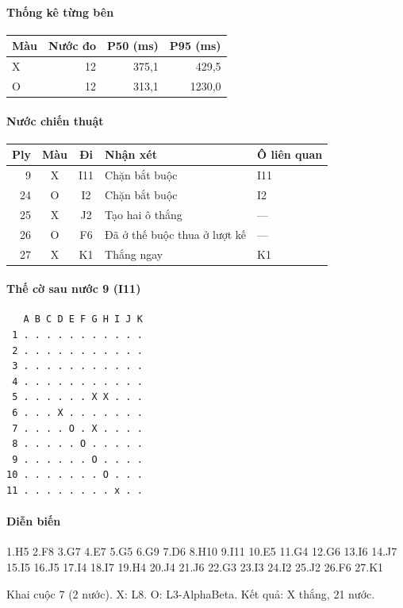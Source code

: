 \paragraph{Thống kê từng bên}
\begin{center}\small
\begin{tabular}{@{}lrrr@{}}
\toprule
Màu & Nước đo & P50 (ms) & P95 (ms) \\
\midrule
X & 12 & 375,1 & 429,5 \\
O & 12 & 313,1 & 1230,0 \\
\bottomrule
\end{tabular}
\end{center}
\paragraph{Nước chiến thuật}
\begin{center}\small
\begin{tabular}{@{}rccll@{}}
\toprule
Ply & Màu & Đi & Nhận xét & Ô liên quan \\
\midrule
9 & X & I11 & Chặn bắt buộc & I11 \\
24 & O & I2 & Chặn bắt buộc & I2 \\
25 & X & J2 & Tạo hai ô thắng & — \\
26 & O & F6 & Đã ở thế buộc thua ở lượt kế & — \\
27 & X & K1 & Thắng ngay & K1 \\
\bottomrule
\end{tabular}
\end{center}
\paragraph{Thế cờ sau nước 9 (I11)}
\begin{verbatim}
   A B C D E F G H I J K
 1 . . . . . . . . . . .
 2 . . . . . . . . . . .
 3 . . . . . . . . . . .
 4 . . . . . . . . . . .
 5 . . . . . . X X . . .
 6 . . . X . . . . . . .
 7 . . . . O . X . . . .
 8 . . . . . O . . . . .
 9 . . . . . . O . . . .
10 . . . . . . . O . . .
11 . . . . . . . . x . .
\end{verbatim}
\paragraph{Diễn biến}
{\footnotesize 1.H5 2.F8 3.G7 4.E7 5.G5 6.G9 7.D6 8.H10 9.I11 10.E5 11.G4 12.G6 13.I6 14.J7 15.I5 16.J5 17.I4 18.I7 19.H4 20.J4 21.J6 22.G3 23.I3 24.I2 25.J2 26.F6 27.K1\par}
Khai cuộc 7 (2 nước). X: L8. O: L3-AlphaBeta. Kết quả: X thắng, 21 nước.
